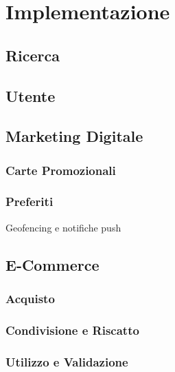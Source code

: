 \section{Implementazione}

\subsection{Ricerca}

\subsection{Utente}

\subsection{Marketing Digitale}

\subsubsection{Carte Promozionali}

\subsubsection{Preferiti}

Geofencing e notifiche push

\subsection{E-Commerce}

\subsubsection{Acquisto}

\subsubsection{Condivisione e Riscatto}

\subsubsection{Utilizzo e Validazione}

\newpage